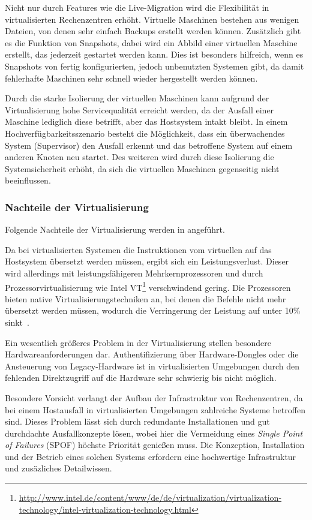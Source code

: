 Nicht nur durch Features wie die Live-Migration wird die Flexibilität in virtualisierten Rechenzentren erhöht.
Virtuelle Maschinen bestehen aus wenigen Dateien, von denen sehr einfach Backups erstellt werden können.
Zusätzlich gibt es die Funktion von Snapshots, dabei wird ein Abbild einer virtuellen Maschine erstellt, das jederzeit gestartet werden kann.
Dies ist besonders hilfreich, wenn es Snapshots von fertig konfigurierten, jedoch unbenutzten Systemen gibt, da damit fehlerhafte Maschinen sehr schnell wieder hergestellt werden können.

Durch die starke Isolierung der virtuellen Maschinen kann aufgrund der Virtualisierung hohe Servicequalität erreicht werden, da der Ausfall einer Maschine lediglich diese betrifft, aber das Hostsystem intakt bleibt.
In einem Hochverfügbarkeitsszenario besteht die Möglichkeit, dass ein überwachendes System (Supervisor) den Ausfall erkennt und das betroffene System auf einem anderen Knoten neu startet.
Des weiteren wird durch diese Isolierung die Systemsicherheit erhöht, da sich die virtuellen Maschinen gegenseitig nicht beeinflussen.

\subsubsection{Nachteile der Virtualisierung}
Folgende Nachteile der Virtualisierung werden in \autocite{Baun2009} angeführt.

Da bei virtualisierten Systemen die Instruktionen vom virtuellen auf das Hostsystem übersetzt werden müssen, ergibt sich ein Leistungsverlust.
Dieser wird allerdings mit leistungsfähigeren Mehrkernprozessoren und durch Prozessorvirtualisierung wie Intel VT\footnote{\url{http://www.intel.de/content/www/de/de/virtualization/virtualization-technology/intel-virtualization-technology.html}} verschwindend gering.
Die Prozessoren bieten native Virtualisierungstechniken an, bei denen die Befehle nicht mehr übersetzt werden müssen, wodurch die Verringerung der Leistung auf unter 10\% sinkt~\autocite{Hardt2005}.

Ein wesentlich größeres Problem in der Virtualisierung stellen besondere Hardwareanforderungen dar.
Authentifizierung über Hardware-Dongles oder die Ansteuerung von Legacy-Hardware ist in virtualisierten Umgebungen durch den fehlenden Direktzugriff auf die Hardware sehr schwierig bis nicht möglich.

Besondere Vorsicht verlangt der Aufbau der Infrastruktur von Rechenzentren, da bei einem Hostausfall in virtualisierten Umgebungen zahlreiche Systeme betroffen sind.
Dieses Problem lässt sich durch redundante Installationen und gut durchdachte Ausfallkonzepte lösen, wobei hier die Vermeidung eines \emph{Single Point of Failures} (SPOF) höchste Priorität genießen muss.
Die Konzeption, Installation und der Betrieb eines solchen Systems erfordern eine hochwertige Infrastruktur und zusäzliches Detailwissen.


